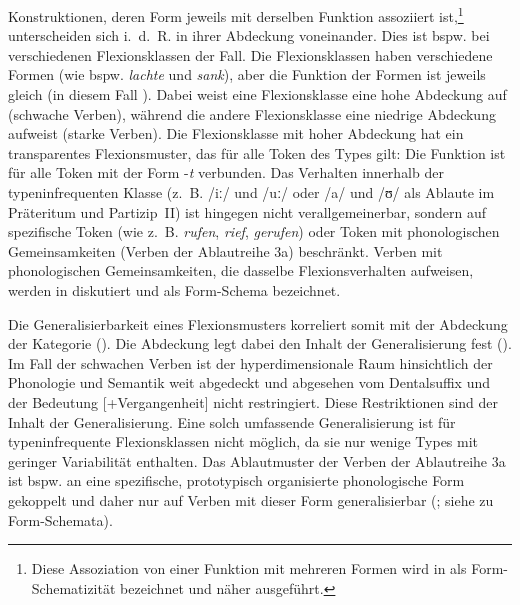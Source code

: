 Konstruktionen, deren Form jeweils mit derselben Funktion assoziiert ist,\footnote{Diese Assoziation von einer Funktion mit mehreren Formen wird in  als Form-Schematizität bezeichnet und näher ausgeführt.} unterscheiden sich i.~d.~R. in ihrer Abdeckung voneinander. Dies ist bspw. bei verschiedenen Flexionsklassen der Fall. Die Flexionsklassen haben verschiedene Formen (wie bspw. \textit{lachte} und \textit{sank}), aber die Funktion der Formen ist jeweils gleich (in diesem Fall ). Dabei weist eine Flexionsklasse eine hohe Abdeckung auf (schwache Verben), während die andere Fle\-xions\-klas\-se eine niedrige Abdeckung aufweist (starke Verben). Die Flexionsklasse mit hoher Abdeckung hat ein transparentes Flexionsmuster, das für alle Token des Types gilt: Die Funktion  ist für alle Token mit der Form -\textit{t} verbunden. Das Verhalten innerhalb der typeninfrequenten Klasse (z.~B. /iː/ und /uː/ oder /a/ und /ʊ/ als Ablaute im Präteritum und Partizip~II) ist hingegen nicht verallgemeinerbar, sondern auf spezifische Token (wie z.~B. \textit{rufen}, \textit{rief}, \textit{gerufen}) oder Token mit phonologischen Gemeinsamkeiten (Verben der Ablautreihe 3a) beschränkt. Verben mit phonologischen Gemeinsamkeiten, die dasselbe Flexionsverhalten aufweisen, werden in  diskutiert und als Form-Schema bezeichnet.

Die Generalisierbarkeit eines Flexionsmusters korreliert somit mit der Abdeckung der Kategorie (\cite[67--68]{Goldberg.2019}). Die Abdeckung legt dabei den Inhalt der Generalisierung fest (\cite[136]{Goldberg.2019}). Im Fall der schwachen Verben ist der hyperdimensionale Raum hinsichtlich der Phonologie und Semantik weit abgedeckt und abgesehen vom Dentalsuffix und der Bedeutung [+Vergangenheit] nicht restringiert. Diese Restriktionen sind der Inhalt der Generalisierung.  Eine solch umfassende Generalisierung ist für typeninfrequente Flexionsklassen nicht möglich, da sie nur wenige Types mit geringer Variabilität enthalten. Das Ablautmuster der Verben der Ablautreihe 3a ist bspw. an eine spezifische, prototypisch organisierte phonologische Form gekoppelt und daher nur auf Verben mit dieser Form generalisierbar (\cite[132--133]{Bybee.1985}; siehe  zu Form-Schemata).


